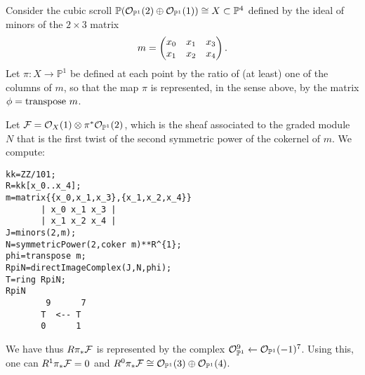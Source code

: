 \documentclass[twoside,12pt, leqno]{amsart}
\def\PP{{\mathbb P}}
\def\P{{\mathbb P}}
\begin{document}
\begin{example}
Consider the cubic scroll 
$\PP(\sO_{\PP^1}(2) \oplus \sO_{\PP^1}(1))\cong X\subset \PP^4
$ 
defined by the ideal of minors of the $2\times 3$ matrix
$$
m=\begin{pmatrix}
x_0& x_1 & x_3 \cr
x_1 & x_2 & x_4 \cr
\end{pmatrix}   .
$$
Let $\pi :X \to \PP^1$ be defined at each point by the ratio of (at least) one of 
the columns of $m$, so that the map $\pi$ is represented, in the sense above,
by the matrix $\phi = {\rm transpose}\ m$. 

Let $\sF = \sO_X(1)\otimes \pi^*\sO_{\PP^1}(2)$, which is the sheaf associated to the
graded module $N$ that is the first twist of the second symmetric power of the cokernel 
of $m$.  We compute:
{\small\begin{verbatim}
kk=ZZ/101;
R=kk[x_0..x_4];
m=matrix{{x_0,x_1,x_3},{x_1,x_2,x_4}}
       | x_0 x_1 x_3 |
       | x_1 x_2 x_4 |
J=minors(2,m);
N=symmetricPower(2,coker m)**R^{1};
phi=transpose m;
RpiN=directImageComplex(J,N,phi);
T=ring RpiN;
RpiN
        9      7
       T  <-- T               
       0      1
\end{verbatim}    }   
\noindent We have thus $R\pi_*{\mathcal F}$ is represented by the complex $\cO_{\PP^1}^9\gets \cO_{\PP^1}(-1)^7$.  Using this, one can $R^1\pi_*{\mathcal F}=0$ and $R^0\pi_*\sF\cong  \sO_{\PP^1}(3) \oplus \sO_{\PP^1}(4)$.
\end{example}
%
%
\end{document}
